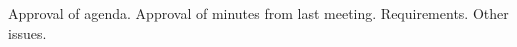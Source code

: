 \nextItem Approval of agenda.
\nextItem Approval of minutes from last meeting.
\nextItem Requirements.
\nextItem Other issues.

